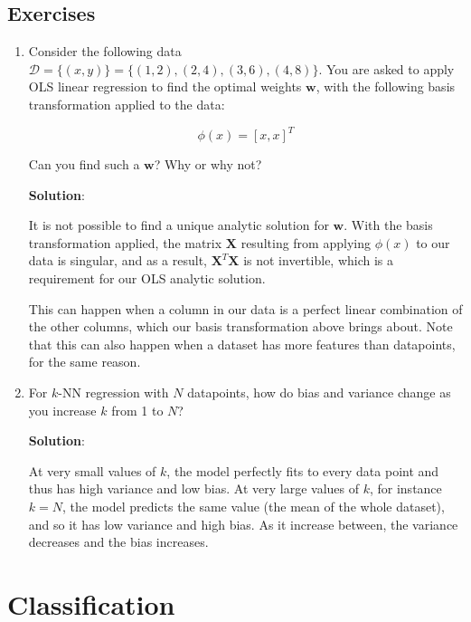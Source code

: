 \documentclass[11pt, letterpaper]{article}
\theoremstyle{definition}
\theoremstyle{plain}
\newenvironment{solution}{
    \vspace{2mm}
    \color{blue}\noindent\textbf{Solution}:
}{}
\begin{document}
\subsection{Exercises}

\begin{mdframed}
    \begin{enumerate}
        \item Consider the following data $\mathcal{D} = \{(x,y)\} = \{(1,2), (2, 4), (3, 6), (4, 8)\}$. You are asked to apply OLS linear regression to find the optimal weights $\bm{w}$, with the following basis transformation applied to the data:

        $$\phi(x) = [x,x]^T$$

        Can you find such a $\bm{w}$? Why or why not?
        
        \begin{solution}
            It is not possible to find a unique analytic solution for $\bm{w}$. With the basis transformation applied, the matrix $\bm{X}$ resulting from applying $\phi(x)$ to our data is singular, and as a result, $\bm{X}^T\bm{X}$ is not invertible, which is a requirement for our OLS analytic solution.
            
            This can happen when a column in our data is a perfect linear combination of the other columns, which our basis transformation above brings about. Note that this can also happen when a dataset has more features than datapoints, for the same reason.
        \end{solution}

        \item For $k$-NN regression with $N$ datapoints, how do bias and variance change as you increase $k$ from 1 to $N$?
        
        \begin{solution}
            At very small values of $k$, the model perfectly fits to every data point and thus has high variance and low bias. At very large values of $k$, for instance $k=N$, the model predicts the same value (the mean of the whole dataset), and so it has low variance and high bias. As it increase between, the variance decreases and the bias increases.
        \end{solution}
    \end{enumerate}
\end{mdframed}

\section{Classification}
\end{document}
